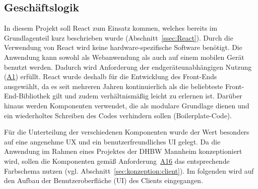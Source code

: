 
\subsection{Geschäftslogik}
\label{ssec:GeschaeftslogikClient}

In diesem Projekt soll React zum Einsatz kommen, welches bereits im Grundlagenteil kurz beschrieben wurde (Abschnitt~\vref{ssec:React}).
Durch die Verwendung von React wird keine hardware-spezifische Software benötigt.
Die Anwendung kann sowohl als Webanwendung als auch auf einem mobilen Gerät benutzt werden.
Dadurch wird Anforderung der endgeräteunabhängigen Nutzung (\hyperref[Anf:A1]{A1}) erfüllt.
React wurde \ua deshalb für die Entwicklung des Front-Ends ausgewählt, da es seit mehreren Jahren kontinuierlich als die beliebteste Front-End-Bibliothek gilt\autocite[Vgl.][]{stackoverflow_Top_Frameworks} und zudem verhältnismäßig leicht zu erlernen ist.
Darüber hinaus werden Komponenten verwendet, die als modulare Grundlage dienen und ein wiederholtes Schreiben des Codes verhindern sollen (Boilerplate-Code).


Für die Unterteilung der verschiedenen Komponenten wurde der Wert besonders auf eine angenehme \acf{UX} und ein benutzerfreundliches \acf{UI} gelegt.
Da die Anwendung im Rahmen eines Projektes der \acs{DHBW} Mannheim konzeptioniert wird, sollen die Komponenten gemäß Anforderung~\hyperref[Anf:A16]{A16} das entsprechende Farbschema nutzen (vgl. Abschnitt~\vref{sec:konzeption:client}).
Im folgenden wird auf den Aufbau der Benutzeroberfläche (\ac{UI}) des Clients eingegangen.
